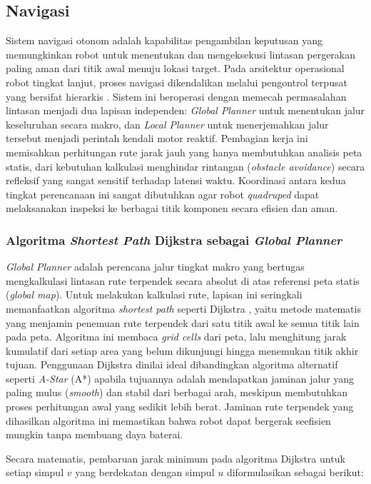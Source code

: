 \subsection{Navigasi}
Sistem navigasi otonom adalah kapabilitas pengambilan keputusan yang memungkinkan robot untuk menentukan dan mengeksekusi lintasan pergerakan paling aman dari titik awal menuju lokasi target. Pada arsitektur operasional robot tingkat lanjut, proses navigasi dikendalikan melalui pengontrol terpusat yang bersifat hierarkis \cite{quigley2009ros}. Sistem ini beroperasi dengan memecah permasalahan lintasan menjadi dua lapisan independen: \textit{Global Planner} untuk menentukan jalur keseluruhan secara makro, dan \textit{Local Planner} untuk menerjemahkan jalur tersebut menjadi perintah kendali motor reaktif. Pembagian kerja ini memisahkan perhitungan rute jarak jauh yang hanya membutuhkan analisis peta statis, dari kebutuhan kalkulasi menghindar rintangan (\textit{obstacle avoidance}) secara refleksif yang sangat sensitif terhadap latensi waktu. Koordinasi antara kedua tingkat perencanaan ini sangat dibutuhkan agar robot \textit{quadruped} dapat melaksanakan inspeksi ke berbagai titik komponen secara efisien dan aman.

\subsubsection{Algoritma \textit{Shortest Path} Dijkstra sebagai \textit{Global Planner}}
\textit{Global Planner} adalah perencana jalur tingkat makro yang bertugas mengkalkulasi lintasan rute terpendek secara absolut di atas referensi peta statis (\textit{global map}). Untuk melakukan kalkulasi rute, lapisan ini seringkali memanfaatkan algoritma \textit{shortest path} seperti Dijkstra \cite{dijkstra2022note}, yaitu metode matematis yang menjamin penemuan rute terpendek dari satu titik awal ke semua titik lain pada peta. Algoritma ini membaca \textit{grid cells} dari peta, lalu menghitung jarak kumulatif dari setiap area yang belum dikunjungi hingga menemukan titik akhir tujuan. Penggunaan Dijkstra dinilai ideal dibandingkan algoritma alternatif seperti \textit{A-Star} (A*) apabila tujuannya adalah mendapatkan jaminan jalur yang paling mulus (\textit{smooth}) dan stabil dari berbagai arah, meskipun membutuhkan proses perhitungan awal yang sedikit lebih berat. Jaminan rute terpendek yang dihasilkan algoritma ini memastikan bahwa robot dapat bergerak seefisien mungkin tanpa membuang daya baterai.

Secara matematis, pembaruan jarak minimum pada algoritma Dijkstra untuk setiap simpul $v$ yang berdekatan dengan simpul $u$ diformulasikan sebagai berikut:

